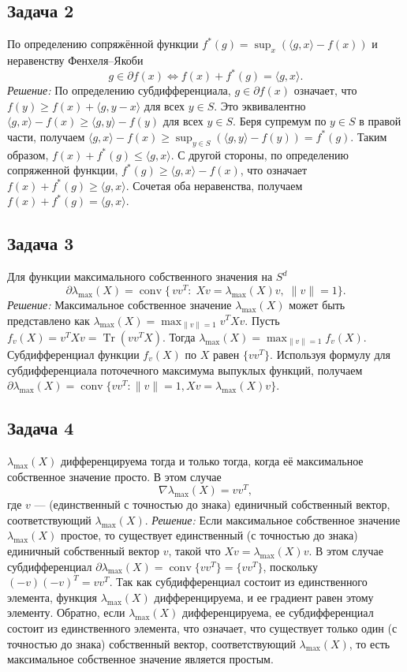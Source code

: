 \documentclass[12pt]{article}
\begin{document}
	\subsection*{Задача 2}
	По определению сопряжённой функции $f^*(g)=\sup_x(\langle g,x\rangle-f(x))$ и неравенству Фенхеля–Якоби
	\[
	g\in\partial f(x)\iff f(x)+f^*(g)=\langle g,x\rangle.
	\]
	\textit{Решение:}
	По определению субдифференциала, $g \in \partial f(x)$ означает, что $f(y) \ge f(x) + \langle g, y-x \rangle$ для всех $y \in S$. Это эквивалентно $\langle g, x \rangle - f(x) \ge \langle g, y \rangle - f(y)$ для всех $y \in S$. Беря супремум по $y \in S$ в правой части, получаем $\langle g, x \rangle - f(x) \ge \sup_{y \in S} (\langle g, y \rangle - f(y)) = f^*(g)$. Таким образом, $f(x) + f^*(g) \le \langle g, x \rangle$.
	С другой стороны, по определению сопряженной функции, $f^*(g) \ge \langle g, x \rangle - f(x)$, что означает $f(x) + f^*(g) \ge \langle g, x \rangle$.
	Сочетая оба неравенства, получаем $f(x) + f^*(g) = \langle g, x \rangle$.
	
	\subsection*{Задача 3}
	Для функции максимального собственного значения на $S^d$
	\[
	\partial\lambda_{\max}(X)
	=\operatorname{conv}\{\,vv^T:\;Xv=\lambda_{\max}(X)v,\;\|v\|=1\}.
	\]
	\textit{Решение:}
	Максимальное собственное значение $\lambda_{\max}(X)$ может быть представлено как $\lambda_{\max}(X) = \max_{\|v\|=1} v^T X v$. Пусть $f_v(X) = v^T X v = \operatorname{Tr}(vv^T X)$. Тогда $\lambda_{\max}(X) = \max_{\|v\|=1} f_v(X)$. Субдифференциал функции $f_v(X)$ по $X$ равен $\{vv^T\}$. Используя формулу для субдифференциала поточечного максимума выпуклых функций, получаем $\partial \lambda_{\max}(X) = \operatorname{conv}\{vv^T : \|v\|=1, Xv = \lambda_{\max}(X)v\}$.
	
	\subsection*{Задача 4}
	$\lambda_{\max}(X)$ дифференцируема тогда и только тогда, когда её максимальное собственное значение просто. В этом случае
	\[
	\nabla\lambda_{\max}(X)=vv^T,
	\]
	где $v$ — (единственный с точностью до знака) единичный собственный вектор, соответствующий $\lambda_{\max}(X)$.
	\textit{Решение:}
	Если максимальное собственное значение $\lambda_{\max}(X)$ простое, то существует единственный (с точностью до знака) единичный собственный вектор $v$, такой что $Xv = \lambda_{\max}(X)v$. В этом случае субдифференциал $\partial \lambda_{\max}(X) = \operatorname{conv}\{vv^T\} = \{vv^T\}$, поскольку $(-v)(-v)^T = vv^T$. Так как субдифференциал состоит из единственного элемента, функция $\lambda_{\max}(X)$ дифференцируема, и ее градиент равен этому элементу. Обратно, если $\lambda_{\max}(X)$ дифференцируема, ее субдифференциал состоит из единственного элемента, что означает, что существует только один (с точностью до знака) собственный вектор, соответствующий $\lambda_{\max}(X)$, то есть максимальное собственное значение является простым.
\end{document}
